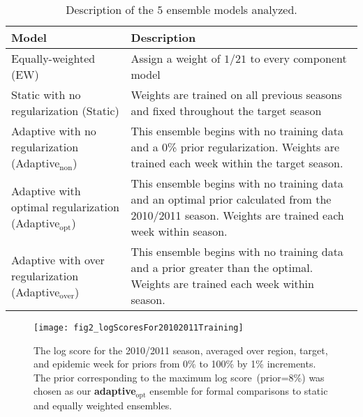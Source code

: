 \documentclass[sagev,times,Review,10pt]{sagej}
\def\adaptOpt{\textbf{adaptive$_{\text{opt}}$ }}
\begin{document}
\clearpage
\begin{table}[ht!]
    \footnotesize
    \begin{tabular}{lL}
        \hline
        Model & Description\\
      \hline
      \vspace{1mm}
      Equally-weighted (EW)  & Assign a weight of $1/21$ to every component model               \\
      \vspace{1mm}
        Static with no regularization (Static) & Weights are trained on all previous seasons and fixed throughout the target season \\
      \vspace{1mm}
      Adaptive with no regularization (Adaptive$_{\text{non}}$) & This ensemble begins with no training data and a 0\% prior regularization. Weights are trained each week within the target season. \\
      \vspace{1mm}
      Adaptive with optimal regularization (Adaptive$_{\text{opt}}$) & This ensemble begins with no training data and an optimal prior calculated from the 2010/2011 season. Weights are trained each week within season.\\
      \vspace{1mm}
        Adaptive with over regularization (Adaptive$_{\text{over}}$) &  This ensemble begins with no training data and a prior greater than the optimal. Weights are trained each week within season.\\
        \hline
    \end{tabular}
    \caption{Description of the $5$ ensemble models analyzed.\label{tb.models}}
\end{table}

\clearpage
\graphicspath{{../../../_6_TLGs/_G/fig2_logScoresFor20102011Training/}}
\begin{figure}[ht!]
  \centering
  \texttt{[image: fig2\_logScoresFor20102011Training]}
  \caption{ The log score for the 2010/2011 season, averaged over region, target, and epidemic week for priors from 0\% to 100\% by 1\% increments.
   The prior corresponding to the maximum log score~(prior=8\%) was chosen as our \adaptOpt ensemble for formal comparisons to static and equally weighted ensembles. \label{fig2.prespecifiedLogScorePlot}}
\end{figure}
\end{document}

